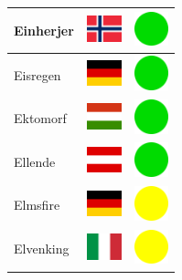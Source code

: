 \documentclass[12pt, a4paper, twoside]{report}
\begin{document}
\begin{center}
\begin{longtable}{|p{5cm}|p{2cm}|p{2cm}|}
 Einherjer                                                  & \includegraphics[width=1cm]{4x3/no} &   \includegraphics[width=1cm]{likes/y} \\ \hline
 Eisregen                                                   & \includegraphics[width=1cm]{4x3/de} &   \includegraphics[width=1cm]{likes/y} \\ \hline
 Ektomorf                                                   & \includegraphics[width=1cm]{4x3/hu} &   \includegraphics[width=1cm]{likes/y} \\ \hline
 Ellende                                                    & \includegraphics[width=1cm]{4x3/at} &   \includegraphics[width=1cm]{likes/y} \\ \hline
 Elmsfire                                                   & \includegraphics[width=1cm]{4x3/de} &   \includegraphics[width=1cm]{likes/m} \\ \hline
 Elvenking                                                  & \includegraphics[width=1cm]{4x3/it} &   \includegraphics[width=1cm]{likes/m} \\ \hline

\end{longtable}
\end{center}
\end{document}
